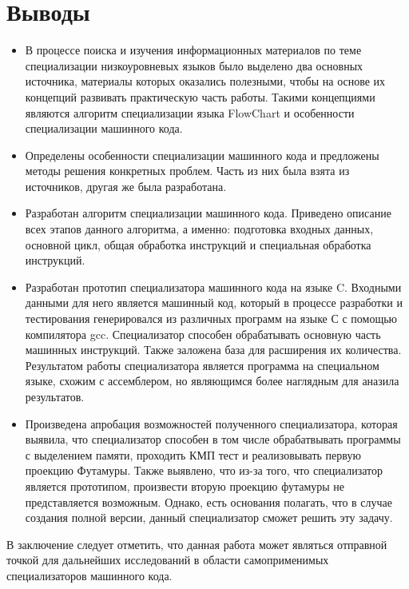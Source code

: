\documentclass{spbau-diploma}
\begin{document}
\section*{Выводы}


\begin{itemize}
\item В процессе поиска и изучения информационных материалов по теме специализации низкоуровневых языков было выделено два основных источника, материалы которых оказались полезными, чтобы на основе их концепций развивать практическую часть работы. Такими концепциями являются алгоритм специализации языка FlowChart и особенности специализации машинного кода.
\item Определены особенности специализации машинного кода и предложены методы решения конкретных проблем. Часть из них была взята из источников, другая же была разработана.
\item Разработан алгоритм специализации машинного кода. Приведено описание всех этапов данного алгоритма, а именно: подготовка входных данных, основной цикл, общая обработка инструкций и специальная обработка инструкций.
\item Разработан прототип специализатора машинного кода на языке C. Входными данными для него является машинный код, который в процессе разработки и тестирования генерировался из различных программ на языке С с помощью компилятора gcc. Специализатор способен обрабатывать основную часть машинных инструкций. Также заложена база для расширения их количества. Результатом работы специализатора является программа на специальном языке, схожим с ассемблером, но являющимся более наглядным для аназила результатов. 
\item Произведена апробация возможностей полученного специализатора, которая выявила, что специализатор способен в том числе обрабатвывать программы с выделением памяти, проходить КМП тест и реализовывать первую проекцию Футамуры. Также выявлено, что из-за того, что специализатор является прототипом, произвести вторую проекцию футамуры не представляется возможным. Однако, есть основания полагать, что в случае создания полной версии, данный специализатор сможет решить эту задачу.

\end{itemize}

В заключение следует отметить, что данная работа может являться отправной точкой для дальнейших исследований в области самоприменимых специализаторов машинного кода.


\end{document}
